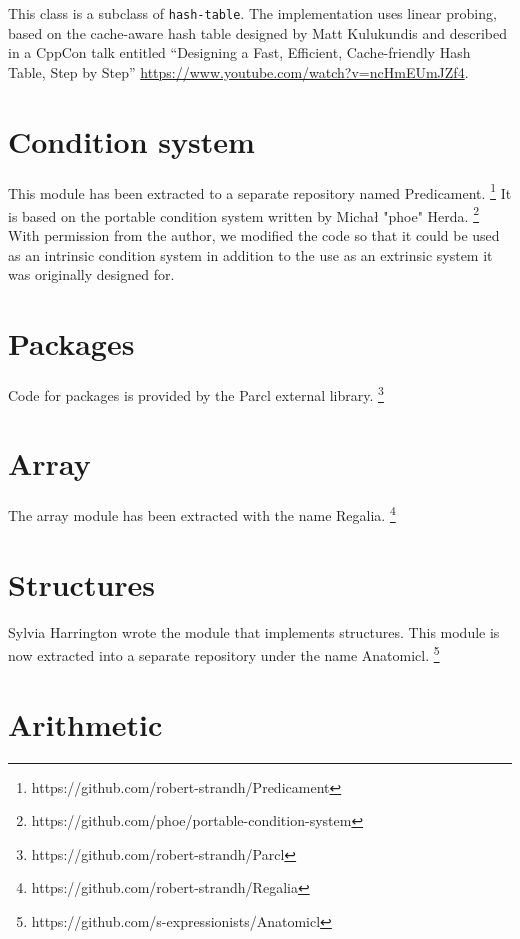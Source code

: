 This class is a subclass of \texttt{hash-table}.  The implementation
uses linear probing, based on the cache-aware hash table designed by
Matt Kulukundis and described in a CppCon talk entitled
``Designing a Fast, Efficient, Cache-friendly Hash Table, Step by Step''
\url{https://www.youtube.com/watch?v=ncHmEUmJZf4}.

\section{Condition system}
\label{sec-condition-system}

This module has been extracted to a separate repository named
Predicament.%
\footnote{https://github.com/robert-strandh/Predicament}
It is based on the portable condition system written by Michał "phoe"
Herda.%
\footnote{https://github.com/phoe/portable-condition-system}
With permission from the author, we modified the code so that it could
be used as an intrinsic condition system in addition to the use as an
extrinsic system it was originally designed for.

\section{Packages}
\label{sec-packages}

Code for packages is provided by the Parcl external library.%
\footnote{https://github.com/robert-strandh/Parcl}

\section{Array}
\label{sec-array}

The array module has been extracted with the name Regalia.%
\footnote{https://github.com/robert-strandh/Regalia}

\section{Structures}
\label{sec-structures}

Sylvia Harrington wrote the \sysname{} module that implements
structures.  This module is now extracted into a separate repository
under the name Anatomicl.%
\footnote{https://github.com/s-expressionists/Anatomicl}

\section{Arithmetic}

